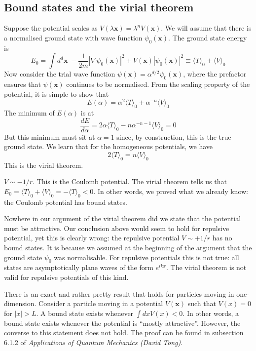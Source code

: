 \subsection{Bound states and the virial theorem}
Suppose the potential scales as $V(\lambda \bm{x}) = \lambda^n V(\bm{x})$. We will assume that there is a normalised ground state with wave function $\psi_0(\bm{x})$.
The ground state energy is
\[E_0 = \int d^d\bm{x} \; -\frac{1}{2m}|\nabla\psi_0(\bm{x})|^2 + V(\bm{x})|\psi_0(\bm{x})|^2 \equiv \langle T \rangle_0 + \langle V \rangle_0\] 
Now consider the trial wave function $\psi(\bm{x}) = \alpha^{d/2} \psi_0(\bm{x})$, where the prefactor ensures
that $\psi(\bm{x})$ continues to be normalised. 
From the scaling property of the potential, it is simple to show that
\[E(\alpha) = \alpha^2 \langle T \rangle_0 + \alpha^{-n} \langle V \rangle_0\]
The minimum of $E(\alpha)$ is at
\[\frac{dE}{d\alpha} = 2\alpha\langle T \rangle_0 -n\alpha^{-n-1}\langle V \rangle_0 = 0\]
But this minimum must sit at $\alpha = 1$ since, by construction, this is the true ground state. We learn that for the homogeneous potentials, we have
\[2\langle T \rangle_0 = n\langle V \rangle_0\]
This is the virial theorem.
\begin{example}
$V \sim -1/r$. This is the Coulomb potential. The virial theorem tells us that $E_0 = \langle T \rangle_0 +  \langle V \rangle_0 = -\langle T \rangle_0 < 0$. In other words, we proved what we already know: the Coulomb potential has bound states.
\end{example}

\begin{note}
Nowhere in our argument of the virial theorem did we state that the potential must be attractive. Our conclusion above would seem to hold for repulsive potential, yet this is clearly wrong: the repulsive potential $V \sim +1/r$ has
no bound states. 
It is because we assumed at the beginning of the argument that the ground state $\psi_0$ was normalisable. For repulsive potentials this is not true: all states are asymptotically plane waves of the form $e^{ikx}$. 
The virial theorem is not valid for repulsive potentials of this kind.
\end{note}

\noindent
There is an exact and rather pretty result that holds for particles moving in one-dimension.
Consider a particle moving in a potential $V(\bm{x})$ such that $V(x) = 0$ for $|x| > L$. A bound state exists whenever $\int dx V(x) < 0$. In other words, a bound state exists whenever the potential is ``mostly attractive''. However, the converse to this statement does not hold. The proof can be found in subsection 6.1.2 of \emph{Applications of Quantum Mechanics (David Tong)}. 

